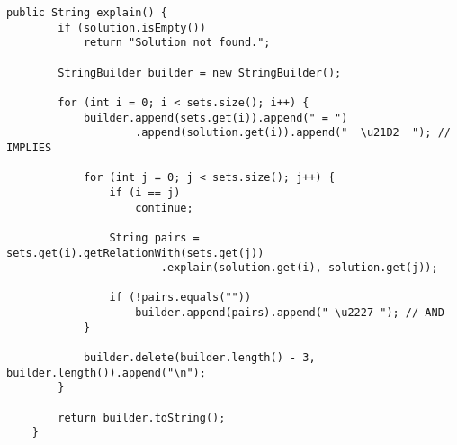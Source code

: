 %
\begin{lstlisting}[caption=Solver.java (cont.), label=lst:solver_c, firstnumber=59]
    public String explain() {
        if (solution.isEmpty())
            return "Solution not found.";

        StringBuilder builder = new StringBuilder();

        for (int i = 0; i < sets.size(); i++) {
            builder.append(sets.get(i)).append(" = ")
                    .append(solution.get(i)).append("  \u21D2  "); // IMPLIES

            for (int j = 0; j < sets.size(); j++) {
                if (i == j)
                    continue;

                String pairs = sets.get(i).getRelationWith(sets.get(j))
                        .explain(solution.get(i), solution.get(j));

                if (!pairs.equals(""))
                    builder.append(pairs).append(" \u2227 "); // AND
            }

            builder.delete(builder.length() - 3, builder.length()).append("\n");
        }

        return builder.toString();
    }
\end{lstlisting}
